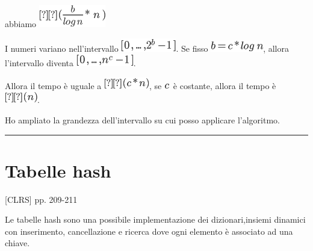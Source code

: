 \documentclass{article}
\begin{document}
{{abbiamo }\includegraphics{images/image214.png}

{I numeri variano nell'intervallo
}\includegraphics{images/image215.png}{. Se fisso
}\includegraphics{images/image216.png}{, allora l'intervallo diventa
}\includegraphics{images/image217.png}{.}

{Allora il tempo è uguale a }\includegraphics{images/image218.png}{, se
}\includegraphics{images/image219.png}{~è costante, allora il tempo è
}\includegraphics{images/image149.png}{.}

{}

{Ho ampliato la grandezza dell'intervallo su cui posso applicare l'algoritmo.}

\begin{center}\rule{0.5\linewidth}{\linethickness}\end{center}

\section{\texorpdfstring{{}}{}}\label{h.nfzrbduhc0fl}

\hypertarget{h.1gvh3qlqsocy}{\section{\texorpdfstring{{Tabelle
hash}}{Tabelle hash}}\label{h.1gvh3qlqsocy}}

{{[}CLRS{]} pp. 209-211}

{}

{Le tabelle hash sono una possibile implementazione dei dizionari,insiemi dinamici con inserimento, cancellazione e ricerca dove ogni elemento è associato ad una chiave.}

}
\end{document}
